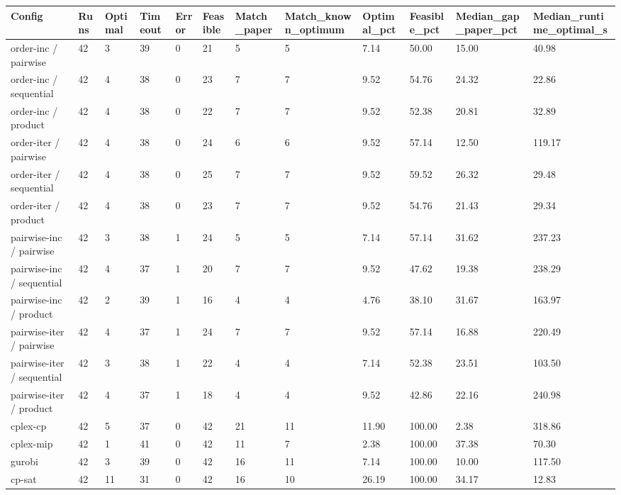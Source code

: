 \begin{tabular}{llllllllllll}
\hline
Config & Runs & Optimal & Timeout & Error & Feasible & Match\_paper & Match\_known\_optimum & Optimal\_pct & Feasible\_pct & Median\_gap\_paper\_pct & Median\_runtime\_optimal\_s \\
\hline
order-inc / pairwise & 42 & 3 & 39 & 0 & 21 & 5 & 5 & 7.14 & 50.00 & 15.00 & 40.98 \\
order-inc / sequential & 42 & 4 & 38 & 0 & 23 & 7 & 7 & 9.52 & 54.76 & 24.32 & 22.86 \\
order-inc / product & 42 & 4 & 38 & 0 & 22 & 7 & 7 & 9.52 & 52.38 & 20.81 & 32.89 \\
order-iter / pairwise & 42 & 4 & 38 & 0 & 24 & 6 & 6 & 9.52 & 57.14 & 12.50 & 119.17 \\
order-iter / sequential & 42 & 4 & 38 & 0 & 25 & 7 & 7 & 9.52 & 59.52 & 26.32 & 29.48 \\
order-iter / product & 42 & 4 & 38 & 0 & 23 & 7 & 7 & 9.52 & 54.76 & 21.43 & 29.34 \\
pairwise-inc / pairwise & 42 & 3 & 38 & 1 & 24 & 5 & 5 & 7.14 & 57.14 & 31.62 & 237.23 \\
pairwise-inc / sequential & 42 & 4 & 37 & 1 & 20 & 7 & 7 & 9.52 & 47.62 & 19.38 & 238.29 \\
pairwise-inc / product & 42 & 2 & 39 & 1 & 16 & 4 & 4 & 4.76 & 38.10 & 31.67 & 163.97 \\
pairwise-iter / pairwise & 42 & 4 & 37 & 1 & 24 & 7 & 7 & 9.52 & 57.14 & 16.88 & 220.49 \\
pairwise-iter / sequential & 42 & 3 & 38 & 1 & 22 & 4 & 4 & 7.14 & 52.38 & 23.51 & 103.50 \\
pairwise-iter / product & 42 & 4 & 37 & 1 & 18 & 4 & 4 & 9.52 & 42.86 & 22.16 & 240.98 \\
cplex-cp & 42 & 5 & 37 & 0 & 42 & 21 & 11 & 11.90 & 100.00 & 2.38 & 318.86 \\
cplex-mip & 42 & 1 & 41 & 0 & 42 & 11 & 7 & 2.38 & 100.00 & 37.38 & 70.30 \\
gurobi & 42 & 3 & 39 & 0 & 42 & 16 & 11 & 7.14 & 100.00 & 10.00 & 117.50 \\
cp-sat & 42 & 11 & 31 & 0 & 42 & 16 & 10 & 26.19 & 100.00 & 34.17 & 12.83 \\
\hline
\end{tabular}
